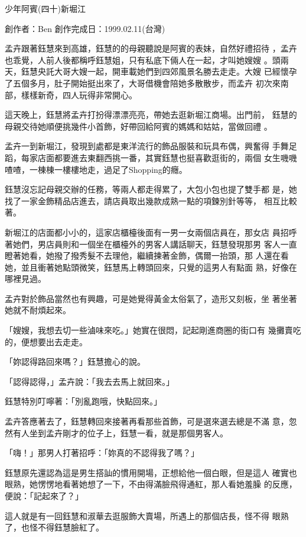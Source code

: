 



少年阿賓(四十)新堀江

創作者：Ben
創作完成日：1999.02.11(台灣)


孟卉跟著鈺慧來到高雄，鈺慧的的母親聽說是阿賓的表妹，自然好禮招待
，孟卉也乖覺，人前人後都稱呼鈺慧姐，只有私底下倆人在一起，才叫她嫂嫂
。頭兩天，鈺慧央託大哥大嫂一起，開車載她們到四郊風景名勝去走走。大嫂
已經懷孕了五個多月，肚子開始挺出來了，大哥借機會陪她多散散步，而孟卉
初次來南部，樣樣新奇，四人玩得非常開心。

這天晚上，鈺慧將孟卉打扮得漂漂亮亮，帶她去逛新堀江商場。出門前，
鈺慧的母親交待她順便挑幾件小首飾，好帶回給阿賓的媽媽和姑姑，當做回禮
。

孟卉一到新堀江，發現到處都是東洋流行的飾品服裝和玩具布偶，興奮得
手舞足蹈，每家店面都要進去東翻西挑一番，其實鈺慧也挺喜歡逛街的，兩個
女生嘰嘰喳喳，一棟棟一樓樓地走，過足了Shopping的癮。

鈺慧沒忘記母親交辦的任務，等兩人都走得累了，大包小包也提了雙手都
是，她找了一家金飾精品店進去，請店員取出幾款成熟一點的項鍊別針等等，
相互比較著。

新堀江的店面都小小的，這家店櫃檯後面有一男一女兩個店員在，那女店
員招呼著她們，男店員則和一個坐在櫃檯外的男客人講話聊天，鈺慧發現那男
客人一直瞪著她看，她撥了撥秀髮不去理他，繼續揀著金飾，偶爾一抬頭，那
人還在看她，並且衝著她點頭微笑，鈺慧馬上轉頭回來，只覺的這男人有點面
熟，好像在哪裡見過。

孟卉對於飾品當然也有興趣，可是她覺得黃金太俗氣了，造形又刻板，坐
著坐著她就不耐煩起來。

「嫂嫂，我想去切一些滷味來吃。」她實在很悶，記起剛進商圈的街口有
幾攤賣吃的，便想要出去走走。

「妳認得路回來嗎？」鈺慧擔心的說。

「認得認得，」孟卉說：「我去去馬上就回來。」

鈺慧特別叮嚀著：「別亂跑哦，快點回來。」

孟卉答應著去了，鈺慧轉回來接著再看那些首飾，可是選來選去總是不滿
意，忽然有人坐到孟卉剛才的位子上，鈺慧一看，就是那個男客人。

「嗨！」那男人打著招呼：「妳真的不認得我了嗎？」

鈺慧原先還認為這是男生搭訕的慣用開場，正想給他一個白眼，但是這人
確實也眼熟，她愣愣地看著她想了一下，不由得滿臉飛得通紅，那人看她羞臊
的反應，便說：「記起來了？」

這人就是有一回鈺慧和淑華去逛服飾大賣場，所遇上的那個店長，怪不得
眼熟了，也怪不得鈺慧臉紅了。


